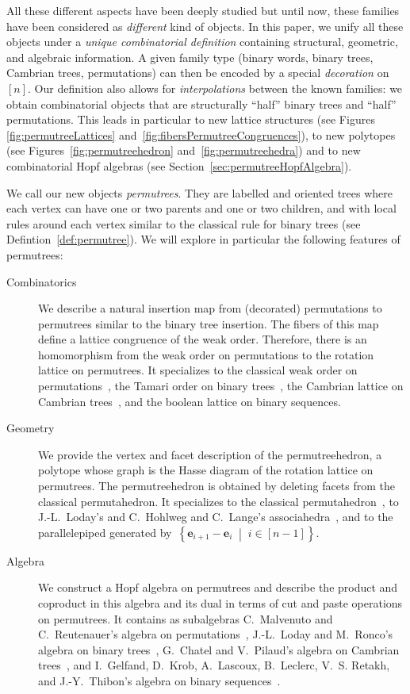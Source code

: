 \documentclass[ALCO]{cedram}
\renewcommand{\b}[1]{\mathbf{#1}} %
\newcommand{\set}[2]{\left\{ #1 \;\middle|\; #2 \right\}} %
\newcommand{\darkblue}{\color{darkblue}} %
\newcommand{\defn}[1]{\emph{\darkblue #1}} %
\begin{document}
All these different aspects have been deeply studied but until now, these families have been considered as \defn{different} kind of objects. In this paper, we unify all these objects under a \defn{unique combinatorial definition} containing structural, geometric, and algebraic information. A given family type (binary words, binary trees, Cambrian trees, permutations) can then be encoded by a special \defn{decoration} on $[n]$. Our definition also allows for \defn{interpolations} between the known families: we obtain combinatorial objects that are structurally ``half'' binary trees and ``half'' permutations. This leads in particular to new lattice structures (see Figures \ref{fig:permutreeLattices} and~\ref{fig:fibersPermutreeCongruences}), to new polytopes (see Figures~\ref{fig:permutreehedron} and~\ref{fig:permutreehedra}) and to new combinatorial Hopf algebras (see Section~\ref{sec:permutreeHopfAlgebra}).

We call our new objects \defn{permutrees}. They are labelled and oriented trees where each vertex can have one or two parents and one or two children, and with local rules around each vertex similar to the classical rule for binary trees (see Defintion~\ref{def:permutree}). We will explore in particular the following features of permutrees:
\begin{description}
\item[Combinatorics] We describe a natural insertion map from (decorated) permutations to permutrees similar to the binary tree insertion. The fibers of this map define a lattice congruence of the weak order. Therefore, there is an homomorphism from the weak order on permutations to the rotation lattice on permutrees. It specializes to the classical weak order on permutations~\cite{LascouxSchutzenberger}, the Tamari order on binary trees~\cite{TamariFestschrift}, the Cambrian lattice on Cambrian trees~\cite{Reading-CambrianLattices, ChatelPilaud}, and the boolean lattice on binary sequences.
\item[Geometry] We provide the vertex and facet description of the permutreehedron, a polytope whose graph is the Hasse diagram of the rotation lattice on permutrees. The permutreehedron is obtained by deleting facets from the classical permutahedron. It specializes to the classical permutahedron~\cite[Lecture~0]{Ziegler}, to J.-L.~Loday's and C.~Hohlweg and C.~Lange's associahedra~\cite{Loday, HohlwegLange}, and to the parallelepiped generated by~$\set{\b{e}_{i+1}-\b{e}_i}{i \in [n-1]}$.
\item[Algebra] We construct a Hopf algebra on permutrees and describe the product and coproduct in this algebra and its dual in terms of cut and paste operations on permutrees. It contains as subalgebras C.~Malvenuto and C.~Reutenauer's algebra on permutations~\cite{MalvenutoReutenauer, DuchampHivertThibon}, J.-L.~Loday and M.~Ronco's algebra on binary trees~\cite{LodayRonco, HivertNovelliThibon-algebraBinarySearchTrees}, G.~Chatel and V.~Pilaud's algebra on Cambrian trees~\cite{ChatelPilaud}, and I.~Gelfand, D.~Krob, A.~Lascoux, B.~Leclerc, V.~S. Retakh, and J.-Y.~Thibon's algebra on binary sequences~\cite{GelfandKrobLascouxLeclercRetakhThibon}.
\end{description}
\end{document}
